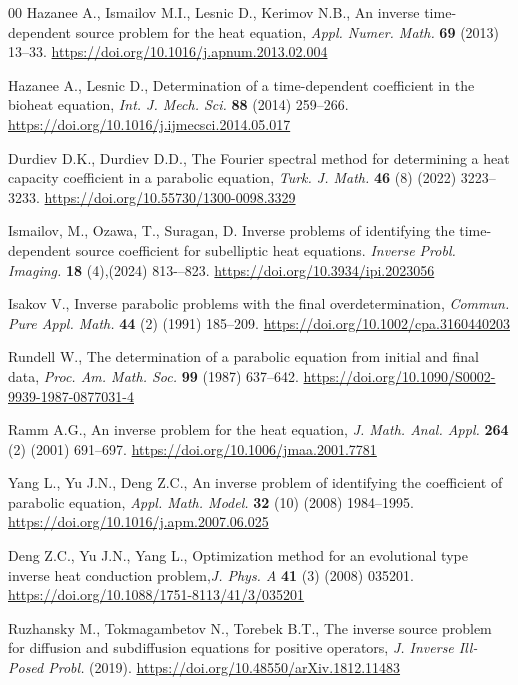 \documentclass[reqno]{amsart}
\begin{document}
\begin{thebibliography}{00}
Hazanee A., Ismailov M.I., Lesnic D., Kerimov N.B., An inverse time-dependent source problem for the heat equation, \textit{Appl. Numer. Math.} \textbf{69} (2013) 13--33. \url{https://doi.org/10.1016/j.apnum.2013.02.004}

Hazanee A., Lesnic D., Determination of a time-dependent coefficient in the bioheat equation, \textit{Int. J. Mech. Sci.} \textbf{88} (2014) 259--266. \url{https://doi.org/10.1016/j.ijmecsci.2014.05.017}

Durdiev D.K., Durdiev D.D., The Fourier spectral method for determining a heat capacity coefficient in a parabolic equation, \textit{Turk. J. Math.} \textbf{46} (8) (2022) 3223--3233. \url{https://doi.org/10.55730/1300-0098.3329}

 Ismailov, M., Ozawa, T., Suragan, D. Inverse problems of identifying the time-dependent source coefficient for subelliptic heat equations. 
\textit{Inverse Probl. Imaging.} \textbf{18} (4),(2024)  813-–823. 
\url{https://doi.org/10.3934/ipi.2023056}

Isakov V., Inverse parabolic problems with the final overdetermination, \textit{Commun. Pure Appl. Math.} \textbf{44} (2) (1991) 185--209. \url{https://doi.org/10.1002/cpa.3160440203}

Rundell W., The determination of a parabolic equation from initial and final data, \textit{Proc. Am. Math. Soc.} \textbf{99} (1987) 637--642. \url{https://doi.org/10.1090/S0002-9939-1987-0877031-4}

Ramm A.G., An inverse problem for the heat equation, \textit{J. Math. Anal. Appl.} \textbf{264} (2) (2001) 691--697. \url{https://doi.org/10.1006/jmaa.2001.7781}

Yang L., Yu J.N., Deng Z.C., An inverse problem of identifying the coefficient of parabolic equation, \textit{Appl. Math. Model.} \textbf{32} (10) (2008) 1984--1995. \url{https://doi.org/10.1016/j.apm.2007.06.025}

Deng Z.C., Yu J.N., Yang L., Optimization method for an evolutional type inverse heat conduction problem,\textit{J. Phys. A} \textbf{41} (3) (2008) 035201. \url{https://doi.org/10.1088/1751-8113/41/3/035201}

Ruzhansky M., Tokmagambetov N., Torebek B.T., The inverse source problem for diffusion and subdiffusion equations for positive operators,  \textit{J. Inverse Ill-Posed Probl.} (2019). \url{https://doi.org/10.48550/arXiv.1812.11483}


\end{thebibliography}
\end{document}

